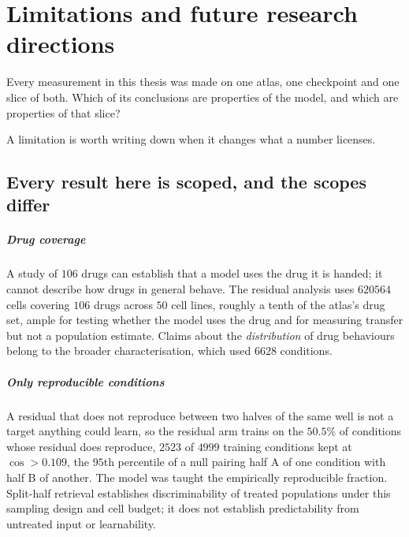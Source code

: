 
\chapter{Limitations and future research directions}
\label{sec:limitations}

\begin{question}
Every measurement in this thesis was made on one atlas, one checkpoint and one
slice of both. Which of its conclusions are properties of the model, and which
are properties of that slice?
\end{question}

\noindent
A limitation is worth writing down when it changes what a number licenses.

\section{Every result here is scoped, and the scopes differ}

\paragraph{Drug coverage} A study of $106$ drugs can establish that a model uses
the drug it is handed; it cannot describe how drugs in general behave. The
residual analysis uses $\num{620564}$ cells covering $106$ drugs across $50$
cell lines, roughly a tenth of the atlas's drug set, ample for testing
whether the model uses the drug and for measuring transfer but not a population
estimate. Claims about the \emph{distribution} of drug behaviours belong to the
broader characterisation, which used $\num{6628}$ conditions.

\paragraph{Only reproducible conditions} A residual that does not reproduce
between two halves of the same well is not a target anything could learn, so the
residual arm trains on the $50.5\%$ of conditions whose residual does reproduce,
$\num{2523}$ of $\num{4999}$ training conditions kept at $\cos > 0.109$, the
$95$th percentile of a null pairing half A of one condition with half B of
another. The model was taught the
empirically reproducible fraction. Split-half retrieval establishes
discriminability of treated populations under this sampling design and cell
budget; it does not establish predictability from untreated input or
learnability.

